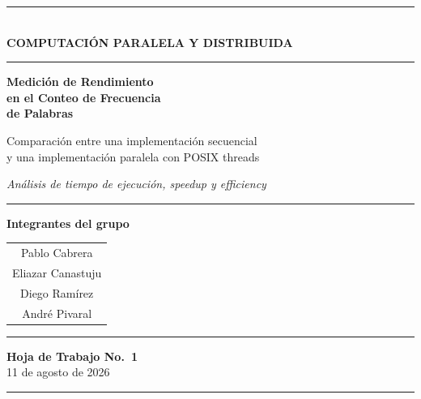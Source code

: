 \documentclass[11pt,letterpaper]{article}
\begin{document}
\begin{titlepage}
\centering
\vspace*{0.3cm}

{\color{azulunc}\rule{\linewidth}{2pt}}\\[6pt]
{\large\bfseries\color{azulunc} COMPUTACIÓN PARALELA Y DISTRIBUIDA}\\[4pt]
{\color{azulunc}\rule{\linewidth}{0.8pt}}

\vspace{1.5cm}

{\Huge\bfseries\color{azulunc} Medición de Rendimiento\\[10pt]
 en el Conteo de Frecuencia\\[10pt] de Palabras}

\vspace{0.7cm}

{\Large\color{azulcl} Comparación entre una implementación secuencial\\[4pt]
 y una implementación paralela con POSIX threads}

\vspace{0.5cm}

{\large\itshape Análisis de tiempo de ejecución, \emph{speedup} y \emph{efficiency}}

\vspace{1.4cm}

{\color{grisln}\rule{0.55\linewidth}{0.6pt}}

\vspace{0.6cm}

{\large\bfseries Integrantes del grupo}

\vspace{0.5cm}

{\large
\begin{tabular}{c}
Pablo Cabrera \\[5pt]
Eliazar Canastuju \\[5pt]
Diego Ramírez \\[5pt]
André Pivaral \\
\end{tabular}}

\vspace{1.0cm}

{\color{grisln}\rule{0.55\linewidth}{0.6pt}}

\vspace{1.1cm}

{\large\bfseries Hoja de Trabajo No.~1}\\[8pt]
{\large 11 de agosto de 2026}

\vspace{0.6cm}
{\color{azulunc}\rule{\linewidth}{2pt}}
\end{titlepage}
\end{document}
